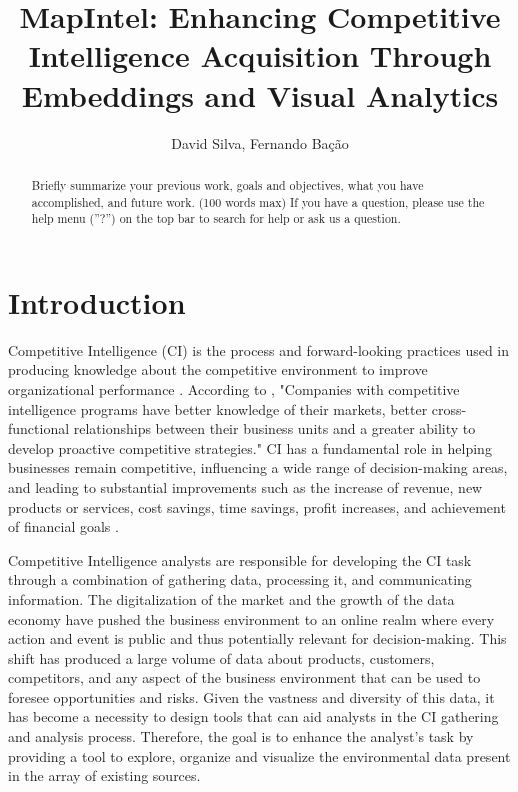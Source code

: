 \documentclass[a4paper]{article}
\title{MapIntel: Enhancing Competitive Intelligence Acquisition Through Embeddings and Visual Analytics}
\author{David Silva, Fernando Bação}
\date{}
\begin{document}
 
\maketitle

\begin{abstract}
	Briefly summarize your previous work, goals and objectives, what you have accomplished, and future work. (100 words max) If you have a question, please use the help menu (''?'') on the top bar to search for help or ask us a question.
\end{abstract}

\section{Introduction}
Competitive Intelligence (CI) is the process and forward-looking practices used in producing knowledge about the competitive environment to improve organizational performance \citet{madureira2021}. According to \citet{brod1999}, "Companies with competitive intelligence programs have better knowledge of their markets, better cross-functional relationships between their business units and a greater ability to develop proactive competitive strategies." CI has a fundamental role in helping businesses remain competitive, influencing a wide range of decision-making areas, and leading to substantial improvements such as the increase of revenue, new products or services, cost savings, time savings, profit increases, and achievement of financial goals \citep{calof2017}.

Competitive Intelligence analysts are responsible for developing the CI task through a combination of gathering data, processing it, and communicating information. The digitalization of the market and the growth of the data economy have pushed the business environment to an online realm where every action and event is public and thus potentially relevant for decision-making. This shift has produced a large volume of data about products, customers, competitors, and any aspect of the business environment that can be used to foresee opportunities and risks. Given the vastness and diversity of this data, it has become a necessity to design tools that can aid analysts in the CI gathering and analysis process. Therefore, the goal is to enhance the analyst's task by providing a tool to explore, organize and visualize the environmental data present in the array of existing sources.
\end{document}
